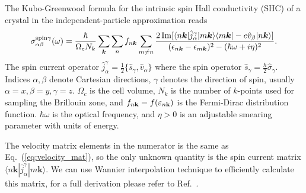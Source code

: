 The Kubo-Greenwood formula for the intrinsic spin Hall conductivity (SHC) of a crystal
in the independent-particle approximation reads \cite{qiao-prb2018,guo-prl2008}
%
\begin{equation}
\label{eq:kubo_shc}
\sigma_{\alpha\beta}^{\text{spin}\gamma}(\omega) =  \frac{\hbar}{\Omega_c N_k}
\sum_{\bm{k}}\sum_{n} f_{n\bm{k}} \\
\sum_{m \neq n}
\frac{2\operatorname{Im}[\langle n\bm{k}| \hat{j}_{\alpha}^{\gamma}|m\bm{k}\rangle
	\langle m\bm{k}| -e\hat{v}_{\beta}|n\bm{k}\rangle]}
{(\epsilon_{n\bm{k}}-\epsilon_{m\bm{k}})^2-(\hbar\omega +i\eta)^2}.
\end{equation}
%
The spin current operator 
$\hat{j}_{\alpha}^{\gamma}=
\frac{1}{2}\{\hat{s}_{\gamma},\hat{v}_{\alpha}\}$ where the spin operator $\hat{s}_{\gamma}=\frac{\hbar}{2}\hat{\sigma}_{\gamma}$. Indices $\alpha,\beta$ denote Cartesian directions, $\gamma$ denotes the direction of spin, usually $\alpha = x, \beta = y, \gamma = z$.  $\Omega_c$ is the
cell volume, $N_k$ is the number of $k$-points used for sampling the
Brillouin zone, and $f_{n{\bf k}}=f(\varepsilon_{n{\bf k}})$ is the
Fermi-Dirac distribution function. $\hbar\omega$ is the optical
frequency, and $\eta>0$ is an adjustable smearing parameter with units
of energy.

The velocity matrix elements in the numerator is the same as   Eq.~(\ref{eq:velocity_mat}), 
so the only unknown quantity is the spin current matrix $\langle n\bm{k}| \hat{j}_{\alpha}^{\gamma}|m\bm{k}\rangle$. 
We can use Wannier interpolation technique to efficiently calculate this matrix, for a full derivation please refer to Ref.~\cite{qiao-prb2018}. 

